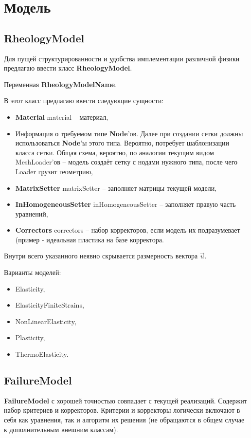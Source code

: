 \documentclass[a4paper,12pt]{article}
\numberwithin{equation}{section}
\begin{document}
\section{Модель}
\subsection{RheologyModel}
	Для пущей структурированности и удобства имплементации различной физики предлагаю ввести класс \textbf{RheologyModel}.
	
	Переменная \textbf{RheologyModelName}.

	В этот класс предлагаю ввести следующие сущности:
	\begin{itemize}
		\item{\textbf{Material} material -- материал,}
		\item{Информация о требуемом типе \textbf{Node}'ов. Далее при создании сетки должны использоваться \textbf{Node}'ы этого типа. Вероятно, потребует шаблонизации класса сетки. Общая схема, вероятно, по аналогии текущим видом MeshLoader'ов -- модель создаёт сетку с нодами нужного типа, после чего Loader грузит геометрию,}
		\item{\textbf{MatrixSetter} matrixSetter -- заполняет матрицы текущей модели,}
		\item{\textbf{InHomogeneousSetter} inHomogeneousSetter -- заполняет правую часть уравнений,}
		\item{\textbf{Correctors} correctors -- набор корректоров, если модель их подразумевает (пример - идеальная пластика на базе корректора.}
	\end{itemize}

	Внутри всего указанного неявно скрывается размерность вектора $\vec{u}$.
	
	Варианты моделей:
	\begin{itemize}
		\item{Elasticity,}
		\item{ElasticityFiniteStrains,}
		\item{NonLinearElasticity,}
		\item{Plasticity,}
		\item{ThermoElasticity.}
	\end{itemize}
	
\subsection{FailureModel}

	\textbf{FailureModel} с хорошей точностью совпадает с текущей реализаций. Содержит набор критериев и корректоров. Критерии и корректоры логически включают в себя как уравнения, так и алгоритм их решения (не обращаются в общем случае к дополнительным внешним классам). 
	
\end{document}
